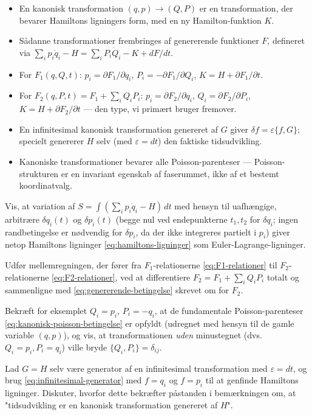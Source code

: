 \begin{itemize}
  \item En kanonisk transformation $(q,p)\to(Q,P)$ er en transformation,
        der bevarer Hamiltons ligningers form, med en ny
        Hamilton-funktion $K$.
  \item Sådanne transformationer frembringes af genererende funktioner
        $F$, defineret via
        $\sum_ip_i\dot q_i-H=\sum_iP_i\dot Q_i-K+dF/dt$.
  \item For $F_1(q,Q,t)$: $p_i=\partial F_1/\partial q_i$,
        $P_i=-\partial F_1/\partial Q_i$, $K=H+\partial F_1/\partial t$.
  \item For $F_2(q,P,t)=F_1+\sum_iQ_iP_i$: $p_i=\partial F_2/\partial q_i$,
        $Q_i=\partial F_2/\partial P_i$, $K=H+\partial F_2/\partial t$
        — den type, vi primært bruger fremover.
  \item En infinitesimal kanonisk transformation genereret af $G$
        giver $\delta f=\varepsilon\{f,G\}$; specielt genererer $H$
        selv (med $\varepsilon=dt$) den faktiske tidsudvikling.
  \item Kanoniske transformationer bevarer alle Poisson-parenteser —
        Poisson-strukturen er en invariant egenskab af faserummet, ikke
        af et bestemt koordinatvalg.
\end{itemize}

\begin{opgave}
Vis, at variation af $S=\int(\sum_ip_i\dot q_i-H)\,dt$ med hensyn til
uafhængige, arbitrære $\delta q_i(t)$ og $\delta p_i(t)$ (begge nul
ved endepunkterne $t_1,t_2$ for $\delta q_i$; ingen randbetingelse er
nødvendig for $\delta p_i$, da der ikke integreres partielt i $p_i$)
giver netop Hamiltons ligninger \eqref{eq:hamiltons-ligninger} som
Euler-Lagrange-ligninger.
\end{opgave}

\begin{opgave}
Udfør mellemregningen, der fører fra $F_1$-relationerne
\eqref{eq:F1-relationer} til $F_2$-relationerne
\eqref{eq:F2-relationer}, ved at differentiere
$F_2=F_1+\sum_iQ_iP_i$ totalt og sammenligne med
\eqref{eq:genererende-betingelse} skrevet om for $F_2$.
\end{opgave}

\begin{opgave}
Bekræft for eksemplet $Q_i=p_i$, $P_i=-q_i$, at de fundamentale
Poisson-parenteser \eqref{eq:kanonisk-poisson-betingelse} er opfyldt
(udregnet med hensyn til de gamle variable $(q,p)$), og vis, at
transformationen \emph{uden} minustegnet (dvs.\ $Q_i=p_i,P_i=q_i$)
ville bryde $\{Q_i,P_i\}=\delta_{ij}$.
\end{opgave}

\begin{opgave}
Lad $G=H$ selv være generator af en infinitesimal transformation med
$\varepsilon=dt$, og brug \eqref{eq:infinitesimal-generator} med
$f=q_i$ og $f=p_i$ til at genfinde Hamiltons ligninger. Diskuter,
hvorfor dette bekræfter påstanden i bemærkningen om, at "tidsudvikling
er en kanonisk transformation genereret af $H$".
\end{opgave}
